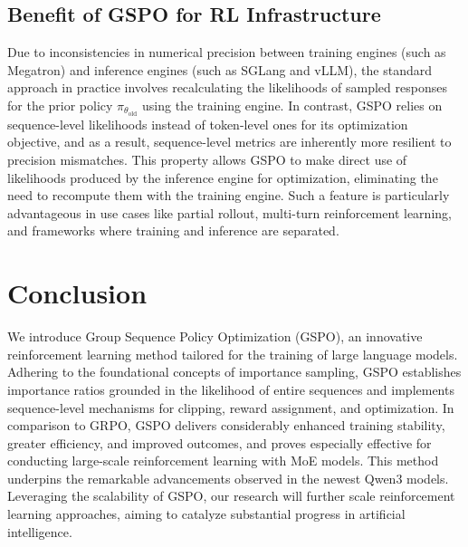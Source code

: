 \subsection{Benefit of GSPO for RL Infrastructure}

Due to inconsistencies in numerical precision between training engines (such as Megatron) and inference engines (such as SGLang and vLLM), the standard approach in practice involves recalculating the likelihoods of sampled responses for the prior policy $\pi_{\theta_\text{old}}$ using the training engine. In contrast, GSPO relies on sequence-level likelihoods instead of token-level ones for its optimization objective, and as a result, sequence-level metrics are inherently more resilient to precision mismatches. This property allows GSPO to make direct use of likelihoods produced by the inference engine for optimization, eliminating the need to recompute them with the training engine. Such a feature is particularly advantageous in use cases like partial rollout, multi-turn reinforcement learning, and frameworks where training and inference are separated.

\section{Conclusion}

We introduce Group Sequence Policy Optimization (GSPO), an innovative reinforcement learning method tailored for the training of large language models. Adhering to the foundational concepts of importance sampling, GSPO establishes importance ratios grounded in the likelihood of entire sequences and implements sequence-level mechanisms for clipping, reward assignment, and optimization. In comparison to GRPO, GSPO delivers considerably enhanced training stability, greater efficiency, and improved outcomes, and proves especially effective for conducting large-scale reinforcement learning with MoE models. This method underpins the remarkable advancements observed in the newest Qwen3 models. Leveraging the scalability of GSPO, our research will further scale reinforcement learning approaches, aiming to catalyze substantial progress in artificial intelligence.

